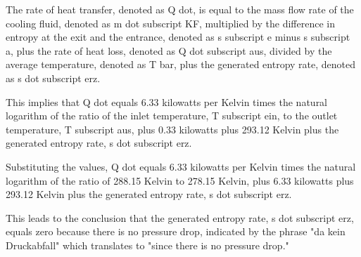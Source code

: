 The rate of heat transfer, denoted as Q dot, is equal to the mass flow rate of the cooling fluid, denoted as m dot subscript KF, multiplied by the difference in entropy at the exit and the entrance, denoted as s subscript e minus s subscript a, plus the rate of heat loss, denoted as Q dot subscript aus, divided by the average temperature, denoted as T bar, plus the generated entropy rate, denoted as s dot subscript erz.

This implies that Q dot equals 6.33 kilowatts per Kelvin times the natural logarithm of the ratio of the inlet temperature, T subscript ein, to the outlet temperature, T subscript aus, plus 0.33 kilowatts plus 293.12 Kelvin plus the generated entropy rate, s dot subscript erz.

Substituting the values, Q dot equals 6.33 kilowatts per Kelvin times the natural logarithm of the ratio of 288.15 Kelvin to 278.15 Kelvin, plus 6.33 kilowatts plus 293.12 Kelvin plus the generated entropy rate, s dot subscript erz.

This leads to the conclusion that the generated entropy rate, s dot subscript erz, equals zero because there is no pressure drop, indicated by the phrase "da kein Druckabfall" which translates to "since there is no pressure drop."